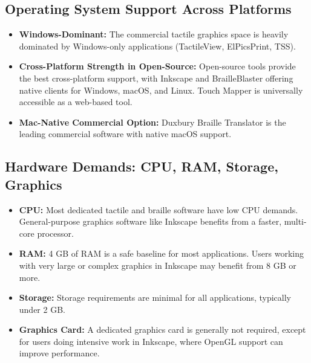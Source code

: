 \subsection{Operating System Support Across Platforms}\label{ch14:ssec:os-support}
\begin{itemize}
	\item \textbf{Windows-Dominant:} The commercial tactile graphics space is heavily dominated by Windows-only applications (TactileView, ElPicsPrint, TSS).
	\item \textbf{Cross-Platform Strength in Open-Source:} Open-source tools provide the best cross-platform support, with Inkscape and BrailleBlaster offering native clients for Windows, macOS, and Linux. Touch Mapper is universally accessible as a web-based tool.
	\item \textbf{Mac-Native Commercial Option:} Duxbury Braille Translator is the leading commercial software with native macOS support.
\end{itemize}

\subsection{Hardware Demands: CPU, RAM, Storage, Graphics}\label{ch14:ssec:hardware-demands}
\begin{itemize}
	\item \textbf{CPU:} Most dedicated tactile and braille software have low CPU demands. General-purpose graphics software like Inkscape benefits from a faster, multi-core processor.
	\item \textbf{RAM:} 4 GB of RAM is a safe baseline for most applications. Users working with very large or complex graphics in Inkscape may benefit from 8 GB or more.
	\item \textbf{Storage:} Storage requirements are minimal for all applications, typically under 2 GB.
	\item \textbf{Graphics Card:} A dedicated graphics card is generally not required, except for users doing intensive work in Inkscape, where OpenGL support can improve performance.
\end{itemize}


